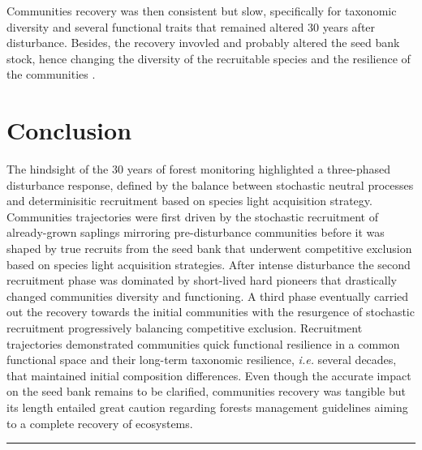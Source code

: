 \documentclass[fleqn,10pt]{ArtEcoFoG} %
\begin{document}
Communities recovery was then consistent but slow, specifically for
taxonomic diversity and several functional traits that remained altered
30 years after disturbance. Besides, the recovery invovled and probably
altered the seed bank stock, hence changing the diversity of the
recruitable species and the resilience of the communities
\citep{Norden2009}.

\section{Conclusion}\label{conclusion}

The hindsight of the 30 years of forest monitoring highlighted a
three-phased disturbance response, defined by the balance between
stochastic neutral processes and determinisitic recruitment based on
species light acquisition strategy. Communities trajectories were first
driven by the stochastic recruitment of already-grown saplings mirroring
pre-disturbance communities before it was shaped by true recruits from
the seed bank that underwent competitive exclusion based on species
light acquisition strategies. After intense disturbance the second
recruitment phase was dominated by short-lived hard pioneers that
drastically changed communities diversity and functioning. A third phase
eventually carried out the recovery towards the initial communities with
the resurgence of stochastic recruitment progressively balancing
competitive exclusion. Recruitment trajectories demonstrated communities
quick functional resilience in a common functional space and their
long-term taxonomic resilience, \emph{i.e.} several decades, that
maintained initial composition differences. Even though the accurate
impact on the seed bank remains to be clarified, communities recovery
was tangible but its length entailed great caution regarding forests
management guidelines aiming to a complete recovery of ecosystems.

\begin{center}\rule{0.5\linewidth}{\linethickness}\end{center}



\makeatletter

\makeatother


\end{document}
